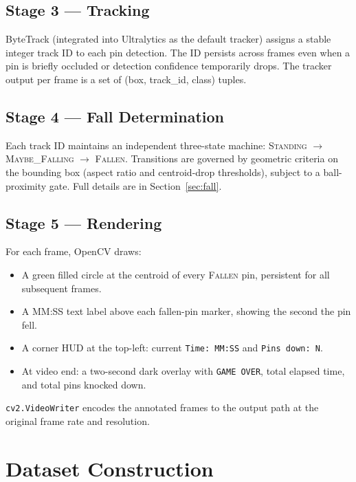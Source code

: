 \documentclass[11pt,a4paper]{article}
\begin{document}
\subsection{Stage 3 --- Tracking}

ByteTrack (integrated into Ultralytics as the default tracker) assigns a stable integer track ID to each pin detection. The ID persists across frames even when a pin is briefly occluded or detection confidence temporarily drops. The tracker output per frame is a set of (box, track\_id, class) tuples.

\subsection{Stage 4 --- Fall Determination}

Each track ID maintains an independent three-state machine: \textsc{Standing} $\to$ \textsc{Maybe\_Falling} $\to$ \textsc{Fallen}. Transitions are governed by geometric criteria on the bounding box (aspect ratio and centroid-drop thresholds), subject to a ball-proximity gate. Full details are in Section~\ref{sec:fall}.

\subsection{Stage 5 --- Rendering}

For each frame, OpenCV draws:
\begin{itemize}
  \item A green filled circle at the centroid of every \textsc{Fallen} pin, persistent for all subsequent frames.
  \item A MM:SS text label above each fallen-pin marker, showing the second the pin fell.
  \item A corner HUD at the top-left: current \texttt{Time: MM:SS} and \texttt{Pins down: N}.
  \item At video end: a two-second dark overlay with \texttt{GAME OVER}, total elapsed time, and total pins knocked down.
\end{itemize}
\texttt{cv2.VideoWriter} encodes the annotated frames to the output path at the original frame rate and resolution.

\section{Dataset Construction}
\end{document}

